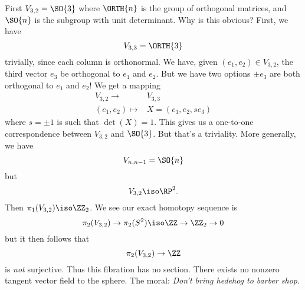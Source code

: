 First $V_{3,2}=\SO{3}$ where $\ORTH{n}$ is the group of
orthogonal matrices, and $\SO{n}$ is the subgroup with unit
determinant. Why is this obvious? First, we have
\begin{equation}
V_{3,3}=\ORTH{3}
\end{equation}
trivially, since each column is orthonormal. We have, given
$(e_1,e_2)\in V_{3,2}$, the third vector $e_{3}$ be orthogonal to
$e_1$ and $e_2$. But we have two options $\pm e_{3}$ are both
orthogonal to $e_1$ and $e_2$! We get a mapping
\begin{equation}
\begin{split}
V_{3,2}\to&V_{3,3}\\
(e_1,e_2)\mapsto & X=(e_1,e_2,se_3)
\end{split}
\end{equation}
where $s=\pm1$ is such that $\det(X)=1$. This gives us a
one-to-one correspondence between $V_{3,2}$ and $\SO{3}$. But
that's a triviality. More generally, we have
\begin{equation}
V_{n,n-1}=\SO{n}
\end{equation}
but
\begin{equation}
V_{3,2}\iso\RP^2.
\end{equation}
Then $\pi_{1}(V_{3,2})\iso\ZZ_2$. We see our exact homotopy
sequence is
\begin{equation}
\pi_{2}(V_{3,2})\to\pi_{2}(S^{2})\iso\ZZ\to\ZZ_2\to 0
\end{equation}
but it then follows that
\begin{equation}
\pi_{2}(V_{3,2})\to\ZZ
\end{equation}
is \emph{not} surjective. Thus this fibration has no
section. There exists no nonzero tangent vector field to the
sphere. The moral: \emph{Don't bring hedehog to barber shop}.%

